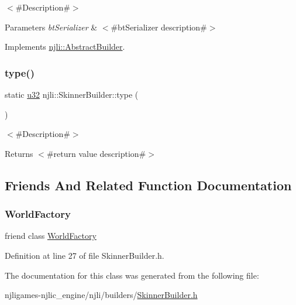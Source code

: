 $<$\#\+Description\#$>$


\begin{DoxyParams}{Parameters}
{\em bt\+Serializer} & $<$\#bt\+Serializer description\#$>$ \\
\hline
\end{DoxyParams}


Implements \mbox{\hyperlink{classnjli_1_1_abstract_builder_ab66b774e02ccb9da554c9aab7fa6d981}{njli\+::\+Abstract\+Builder}}.

\mbox{\label{classnjli_1_1_skinner_builder_ab9ce72b50595aff70d438828f3125fd9}} 
\subsubsection{\texorpdfstring{type()}{type()}}
{\footnotesize\ttfamily static \mbox{\hyperlink{_util_8h_a10e94b422ef0c20dcdec20d31a1f5049}{u32}} njli\+::\+Skinner\+Builder\+::type (\begin{DoxyParamCaption}{ }\end{DoxyParamCaption})\hspace{0.3cm}{\ttfamily [static]}}

$<$\#\+Description\#$>$

\begin{DoxyReturn}{Returns}
$<$\#return value description\#$>$ 
\end{DoxyReturn}


\subsection{Friends And Related Function Documentation}
\mbox{\label{classnjli_1_1_skinner_builder_acb96ebb09abe8f2a37a915a842babfac}} 
\subsubsection{\texorpdfstring{World\+Factory}{WorldFactory}}
{\footnotesize\ttfamily friend class \mbox{\hyperlink{classnjli_1_1_world_factory}{World\+Factory}}\hspace{0.3cm}{\ttfamily [friend]}}



Definition at line 27 of file Skinner\+Builder.\+h.



The documentation for this class was generated from the following file\+:\begin{DoxyCompactItemize}
\item 
njligames-\/njlic\+\_\+engine/njli/builders/\mbox{\hyperlink{_skinner_builder_8h}{Skinner\+Builder.\+h}}\end{DoxyCompactItemize}
